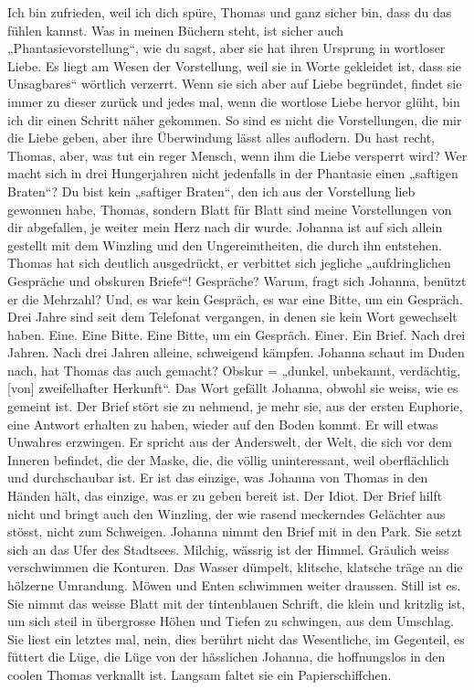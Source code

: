 Ich bin zufrieden, weil ich dich spüre, Thomas und ganz sicher bin, dass du das fühlen kannst.
Was in meinen Büchern steht, ist sicher auch „Phantasievorstellung“, wie du sagst, aber sie hat ihren Ursprung in wortloser Liebe. Es liegt am Wesen der Vorstellung, weil sie in Worte gekleidet ist, dass sie Unsagbares“ wörtlich verzerrt. Wenn sie sich aber auf Liebe begründet, findet sie immer zu dieser zurück und jedes mal, wenn die wortlose Liebe hervor glüht, bin ich dir einen Schritt näher gekommen. So sind es nicht die Vorstellungen, die mir die Liebe geben, aber ihre Überwindung lässt alles auflodern. Du hast recht, Thomas, aber, was tut ein reger Mensch, wenn ihm die Liebe versperrt wird?
Wer macht sich in drei Hungerjahren nicht jedenfalls in der Phantasie einen „saftigen Braten“?
Du bist kein „saftiger Braten“, den ich aus der Vorstellung lieb gewonnen habe, Thomas, sondern Blatt für Blatt sind meine Vorstellungen von dir abgefallen, je weiter mein Herz nach dir wurde.
Johanna ist auf sich allein gestellt mit dem Winzling und den Ungereimtheiten, die durch ihn entstehen. Thomas hat sich deutlich ausgedrückt, er verbittet sich jegliche „aufdringlichen Gespräche und obskuren Briefe“! 
Gespräche? Warum, fragt sich Johanna, benützt er die Mehrzahl? Und, es war kein Gespräch, es war eine Bitte, um ein Gespräch. Drei Jahre sind seit dem Telefonat vergangen, in denen sie kein Wort gewechselt haben. 
Eine. Eine Bitte. Eine Bitte, um ein Gespräch. Einer. Ein Brief. Nach drei Jahren. Nach drei Jahren alleine, schweigend kämpfen.
Johanna schaut im Duden nach, hat Thomas das auch gemacht? Obskur =  „dunkel, unbekannt, verdächtig, [von] zweifelhafter Herkunft“. Das Wort gefällt Johanna, obwohl sie weiss, wie es gemeint ist.
Der Brief stört sie zu nehmend, je mehr sie, aus der ersten Euphorie, eine Antwort erhalten zu haben, wieder auf den Boden kommt. Er will etwas Unwahres erzwingen. 
Er spricht aus der Anderswelt, der Welt, die sich vor dem Inneren befindet, die der Maske, die, die völlig uninteressant, weil oberflächlich und durchschaubar ist. Er ist das einzige, was Johanna von Thomas in den Händen hält, das einzige, was er zu geben bereit ist. Der Idiot. Der Brief hilft nicht und bringt auch den Winzling, der wie rasend meckerndes Gelächter aus stösst, nicht zum Schweigen.
Johanna nimmt den Brief mit in den Park. Sie setzt sich an das Ufer des Stadtsees. Milchig, wässrig ist der Himmel. Gräulich weiss verschwimmen die Konturen. Das Wasser dümpelt, klitsche, klatsche träge an die hölzerne Umrandung. Möwen und Enten schwimmen weiter draussen. Still ist es. Sie nimmt das weisse Blatt mit der tintenblauen Schrift, die klein und kritzlig ist, um sich steil in übergrosse Höhen und Tiefen zu schwingen, aus dem Umschlag. Sie liest ein letztes mal, nein, dies berührt nicht das Wesentliche, im Gegenteil, es füttert die Lüge, die Lüge von der hässlichen Johanna, die hoffnungslos in den coolen Thomas verknallt ist. Langsam faltet sie ein Papierschiffchen. 
